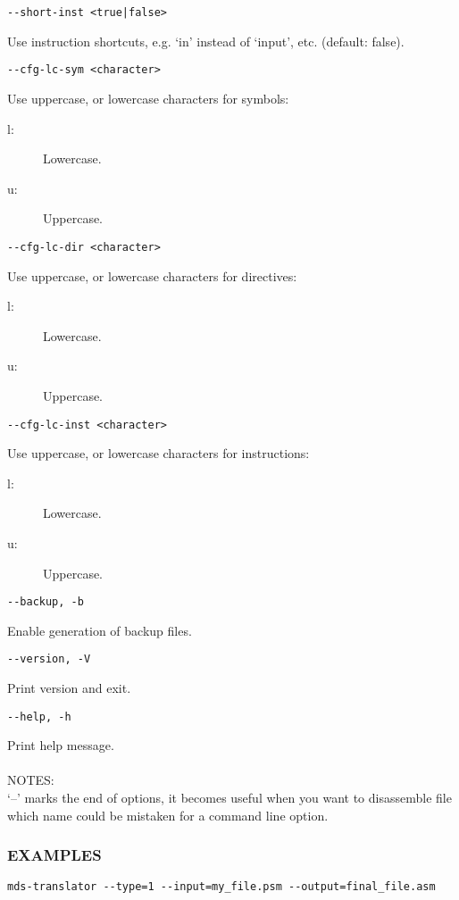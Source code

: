                 {
                \usecodefont

                \verb'--short-inst <true|false>'\\
                }
                Use instruction shortcuts, e.g. `in' instead of `input', etc. (default: false).
                {
                \usecodefont

                \verb'--cfg-lc-sym <character>'\\
                }
                Use uppercase, or lowercase characters for symbols:
                \begin{description}
                    \item [l:] Lowercase.
                    \item [u:] Uppercase.
                \end{description}
                {
                \usecodefont

                \verb'--cfg-lc-dir <character>'\\
                }
                Use uppercase, or lowercase characters for directives:
                \begin{description}
                    \item [l:] Lowercase.
                    \item [u:] Uppercase.
                \end{description}
                {
                \usecodefont

                \verb'--cfg-lc-inst <character>'\\
                }
                Use uppercase, or lowercase characters for instructions:
                \begin{description}
                    \item [l:] Lowercase.
                    \item [u:] Uppercase.
                \end{description}
                                {
                \usecodefont

                \verb'--backup, -b'\\
                }
                Enable generation of backup files.
                {
                \usecodefont

                \verb'--version, -V'\\
                }
                Print version and exit.
                {
                \usecodefont

                \verb'--help, -h'\\
                }
                Print help message.\\\\
                NOTES:\\
                `--' marks the end of options, it becomes useful when you want to disassemble file which name could be mistaken for a command line option.
            \subsubsection{EXAMPLES}
                {
                \usecodefont
                \verb'mds-translator --type=1 --input=my_file.psm --output=final_file.asm'\\
                }

